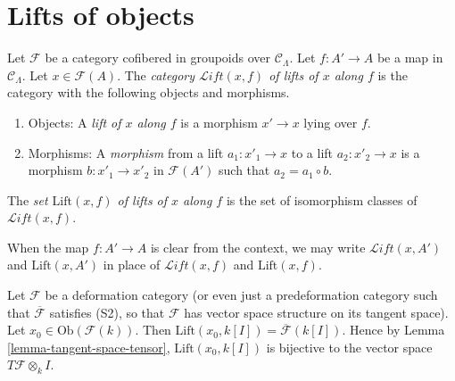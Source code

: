 \section{Lifts of objects}
\label{section-lifts}

\begin{definition}
\label{definition-lifts}
Let $\mathcal{F}$ be a category cofibered in groupoids over $\mathcal 
C_\Lambda$.  Let $f: A' \to A$ be a map in $\mathcal{C}_\Lambda$.  
Let $x \in \mathcal{F}(A)$.  The {\it category $\mathcal{L}\textit{ift}(x,f)$ 
of lifts of $x$ along $f$} is the category with the following objects and 
morphisms. 
\begin{enumerate}
\item Objects: A {\it lift of $x$ along $f$} is a morphism $x' \to x$ 
lying over $f$.  
\item Morphisms: A {\it morphism} from a lift $a_1: x'_{1} \to x$ to a 
lift $a_2: x'_{2} \to x$ is a morphism $b: x'_1 \to x'_2$ in 
$\mathcal{F}(A')$ such that $a_2 = a_1 \circ b$.
\end{enumerate}
The {\it set $\text{Lift}(x,f)$ of lifts of $x$ along $f$} is the set of 
isomorphism classes of $\mathcal{L}\textit{ift}(x,f)$.
\end{definition}

\begin{remark}
\label{remark-omit-arrow}
When the map $f: A' \to A$ is clear from the context, we may write 
$\mathcal{L}\textit{ift}(x,A')$ and $\text{Lift}(x,A')$ in place of 
$\mathcal{L}\textit{ift}(x,f)$ and $\text{Lift}(x,f)$. 
\end{remark}

\begin{remark}
\label{remark-tangent-space-lifting}
Let $\mathcal{F}$ be a deformation category (or even just a predeformation 
category such that $\overline{\mathcal{F}}$ satisfies (S2), so that
$\mathcal{F}$ 
has vector space structure on its tangent space).  Let $x_0 \in 
\text{Ob}(\mathcal{F}(k))$.  Then $\text{Lift}(x_0, k[I]) = 
\overline{\mathcal{F}}(k[I])$. Hence by Lemma \ref{lemma-tangent-space-tensor}, 
$\text{Lift}(x_0, k[I])$ is bijective to the vector space $T\mathcal{F} 
\otimes_{k} I$.
\end{remark}

